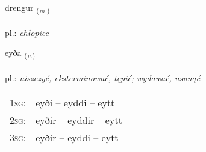 \documentclass[frontgrid, backgrid]{flacards}\usepackage[]{graphicx}\usepackage[]{xcolor}
\begin{document}
\renewcommand{\blhead}{\vskip5pt {\small\bfseries\footnotesize Nafnorð | Noun }}
\renewcommand{\bcfoot}{\vskip5pt \hspace{2pt}{\small\bfseries\footnotesize 1K}}


{drengur \small{\textsubscript{(\textit{m.})}} \\[1ex] %
\textphonetic{[treiŋkʏr]} \\
pl.: \emph{chłopiec} \\  [2ex]
\renewcommand*{\arraystretch}{0.8}
}

\renewcommand{\flhead}{\vskip5pt \fboxsep=0pt {\small\bfseries\footnotesize Sagnorð | Verb}}
\renewcommand{\fcfoot}{\vskip5pt \fboxsep=0pt \hspace{2pt}{\small\bfseries\footnotesize 1K}}

\renewcommand{\blhead}{\vskip5pt {\small\bfseries\footnotesize Sagnorð | Verb }}
\renewcommand{\bcfoot}{\vskip5pt \hspace{2pt}{\small\bfseries\footnotesize 1K}}


{eyða \small{\textsubscript{(\textit{v.})}} \\[1ex] %
\textphonetic{[eiːða]} \\
pl.: \emph{niszczyć, eksterminować, tępić; wydawać, usunąć} \\  [2ex]
\renewcommand*{\arraystretch}{0.8}
\begin{tabular}{p{1cm}l}
\textsc{1sg}: & eyði -- eyddi -- eytt \\ 
\textsc{2sg}: & eyðir -- eyddir -- eytt \\ 
\textsc{3sg}: & eyðir -- eyddi -- eytt \\ 
\end{tabular}
}

\renewcommand{\flhead}{\vskip5pt \fboxsep=0pt {\small\bfseries\footnotesize Sagnorð | Verb}}
\renewcommand{\fcfoot}{\vskip5pt \fboxsep=0pt \hspace{2pt}{\small\bfseries\footnotesize 1K}}
\end{document}
